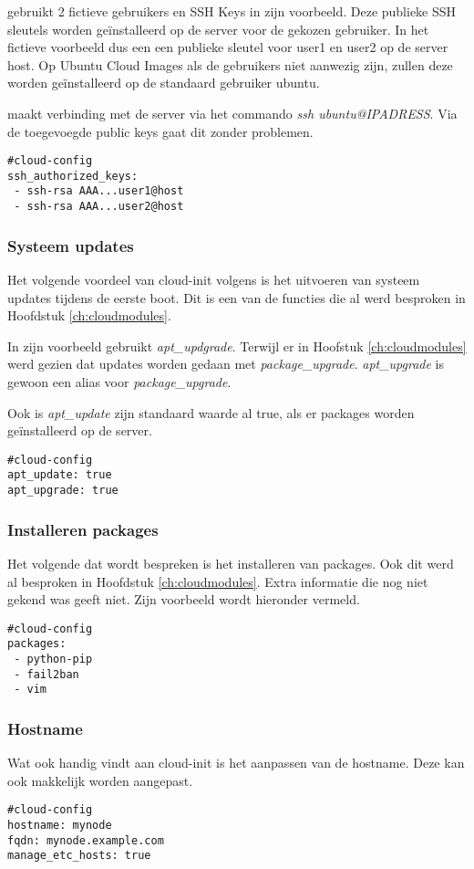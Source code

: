 \autocite{viktorpet} gebruikt 2 fictieve gebruikers en SSH Keys in zijn voorbeeld. Deze publieke SSH sleutels worden geïnstalleerd op de server voor de gekozen gebruiker. In het fictieve voorbeeld dus een een publieke sleutel voor user1 en user2 op de server host. Op Ubuntu Cloud Images als de gebruikers niet aanwezig zijn, zullen deze worden geïnstalleerd op de standaard gebruiker ubuntu. 

\autocite{viktorpet} maakt verbinding met de server via het commando \textit{ssh ubuntu@IPADRESS}. Via de toegevoegde public keys gaat dit zonder problemen.
\begin{lstlisting}
#cloud-config
ssh_authorized_keys:
 - ssh-rsa AAA...user1@host
 - ssh-rsa AAA...user2@host
\end{lstlisting} 

\subsubsection{Systeem updates}
Het volgende voordeel van cloud-init volgens \autocite{viktorpet} is het uitvoeren van systeem updates tijdens de eerste boot. Dit is een van de functies die al werd besproken in Hoofdstuk \ref*{ch:cloudmodules}.

In zijn voorbeeld gebruikt \autocite{viktorpet} \textit{apt\_updgrade}. Terwijl er in Hoofstuk \ref*{ch:cloudmodules} werd gezien dat updates worden gedaan met \textit{package\_upgrade}. \textit{apt\_upgrade} is gewoon een alias voor \textit{package\_upgrade}.

Ook is \textit{apt\_update} zijn standaard waarde al true, als er packages worden geïnstalleerd op de server. 
\begin{lstlisting}
#cloud-config
apt_update: true
apt_upgrade: true
\end{lstlisting} 

\subsubsection{Installeren packages}
Het volgende dat wordt bespreken is het installeren van packages. Ook dit werd al besproken in Hoofdstuk \ref*{ch:cloudmodules}. Extra informatie die nog niet gekend was geeft \autocite{viktorpet} niet. Zijn voorbeeld wordt hieronder vermeld.
\begin{lstlisting}
#cloud-config
packages:
 - python-pip
 - fail2ban
 - vim
\end{lstlisting} 

\subsubsection{Hostname}
Wat \autocite{viktorpet} ook handig vindt aan cloud-init is het aanpassen van de hostname. Deze kan ook makkelijk worden aangepast.
\begin{lstlisting}
#cloud-config
hostname: mynode
fqdn: mynode.example.com
manage_etc_hosts: true
\end{lstlisting} 

